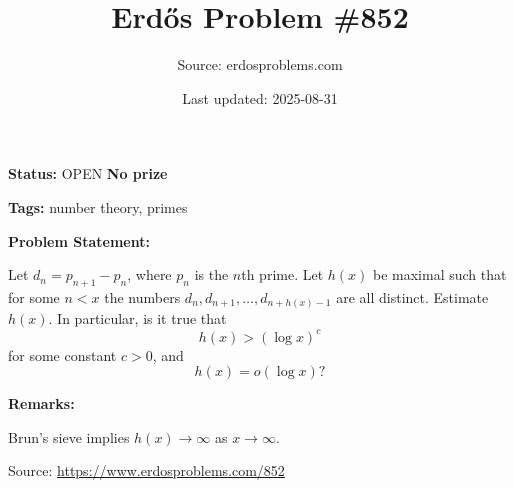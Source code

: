 \documentclass{article}
\title{Erd\H{o}s Problem \#852}
\date{Last updated: 2025-08-31}
\author{Source: erdosproblems.com}
\begin{document}
\maketitle

\noindent\textbf{Status:} OPEN \quad \textbf{No prize}

\noindent\textbf{Tags:} number theory, primes

\medskip
\noindent\textbf{Problem Statement:}

Let $d_n=p_{n+1}-p_n$, where $p_n$ is the $n$th prime. Let $h(x)$ be maximal such that for some $n<x$ the numbers $d_n,d_{n+1},\ldots,d_{n+h(x)-1}$ are all distinct. Estimate $h(x)$. In particular, is it true that\[h(x) >(\log x)^c\]for some constant $c>0$, and\[h(x)=o(\log x)?\]

\bigskip
\noindent\textbf{Remarks:}

Brun's sieve implies $h(x) \to \infty$ as $x\to \infty$.

\bigskip
\noindent\small{Source: \url{https://www.erdosproblems.com/852}}
\end{document}

